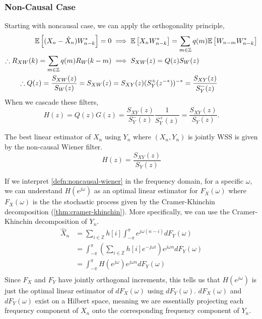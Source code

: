 \subsubsection{Non-Causal Case}
Starting with noncausal case, we can apply the orthogonality principle,
\begin{align*}
	\mathbb{E}\left[(X_n-\hat{X}_n)W_{n-k}^*\right] = 0 &\implies \mathbb{E}\left[X_nW^*_{n-k}\right] = \sum_{m\in\mathbb{Z}}q(m)\mathbb{E}\left[W_{n-m}W^*_{n-k}\right]\\
	\therefore R_{XW}(k) = \sum_{m\in\mathbb{Z}}q(m)R_W(k-m) &\implies S_{XW}(z) = Q(z)S_W(z)\\
	\therefore Q(z) = \frac{S_{XW}(z)}{S_W(z)} = S_{XW}(z) &= S_{XY}(z)(S_Y^+(z^{-*}))^{-*} = \frac{S_{XY}(z)}{S_Y^-(z)}
\end{align*}
When we cascade these filters, \[
	H(z) = Q(z)G(z) = \frac{S_{XY}(z)}{S_Y^-(z)} \frac{1}{S_Y^+(z)}= \frac{S_{XY}(z)}{S_Y(z)}.
\]
\begin{definition}
	The best linear estimator of $X_n$ using $Y_n$ where $(X_n, Y_n)$ is jointly WSS is given by the non-causal Wiener filter.
	\[
		H(z) = \frac{S_{XY}(z)}{S_Y(z)}
	\]
	\label{defn:noncausal-wiener}
\end{definition}
If we interpret \cref{defn:noncausal-wiener} in the frequency domain, for a specific $\omega$, we can understand $H(e^{j\omega})$ as an optimal linear estimator for $F_X(\omega)$ where $F_X(\omega)$ is the the stochastic process given by the Cramer-Khinchin decomposition (\cref{thm:cramer-khinchin}).
More specifically, we can use the Cramer-Khinchin decomposition of $Y_n$.
\begin{align*}
	\hat{X}_n &= \sum_{i\in\mathbb{Z}}h[i]\int_{-\pi}^\pi e^{j\omega(n-i)}dF_Y(\omega)\\
	&= \int_{-\pi}^{\pi}\left(\sum_{i\in\mathbb{Z}}h[i]e^{-j\omega i}\right)e^{j\omega n}dF_Y(\omega) \\
	&= \int_{-\pi}^\pi H(e^{j\omega})e^{j\omega n}dF_Y(\omega)\\
\end{align*}
Since $F_X$ and $F_Y$ have jointly orthogonal increments, this tells us that $H(e^{j\omega})$ is just the optimal linear estimator of $dF_X(\omega)$ using $dF_Y(\omega)$.
$dF_X(\omega)$ and $dF_Y(\omega)$ exist on a Hilbert space, meaning we are essentially projecting each frequency component of $X_n$ onto the corresponding frequency component of $Y_n$.
